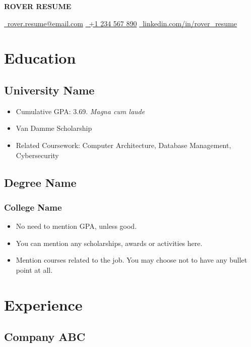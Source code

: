 \documentclass[11pt]{article}
\begin{document}
\begin{center}
  {\Huge\bfseries\uppercase{Rover Resume}} \\ \medskip

  \href{mailto:youremail@example.com}{\faEnvelope\ rover.resume@email.com} \quad
  \href{tel:1234567890}{\faPhone\ +1 234 567 890} \quad
  \href{https://www.linkedin.com}{\faLinkedin\ linkedin.com/in/rover\_resume}
\end{center}


\section{Education}
\subsection{University Name  }
\begin{itemize}
	\item Cumulative GPA: 3.69. \textit{Magna cum laude} 
	\item Van Damme Scholarship
  \item Related Coursework: Computer Architecture, Database Management, Cybersecurity
\end{itemize}

\subsection{Degree Name }
\subsubsection{College Name }
\begin{itemize}
	\item No need to mention GPA, unless good.
	\item You can mention any scholarships, awards or activities here.
  \item Mention courses related to the job. You may choose not to have any bullet point at all.
\end{itemize}


\section{Experience}
\subsection{Company ABC }
\end{document}
